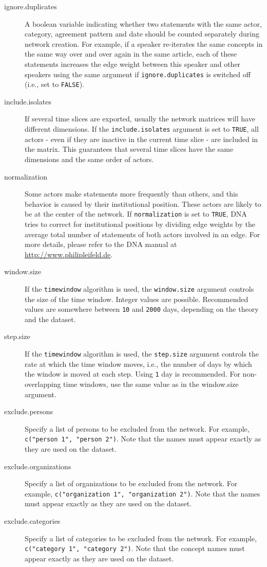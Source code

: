 \documentclass[a4paper, 10pt]{article}
\begin{document}
\begin{description}
  \item[ignore.duplicates]{ A boolean variable indicating whether two statements with the same actor, category, agreement pattern and date should be counted separately during network creation. For example, if a speaker re-iterates the same concepts in the same way over and over again in the same article, each of these statements increases the edge weight between this speaker and other speakers using the same argument if \texttt{ignore.duplicates} is switched off (i.e., set to \texttt{FALSE}). }
  \item[include.isolates]{ If several time slices are exported, usually the network matrices will have different dimensions. If the \texttt{include.isolates} argument is set to \texttt{TRUE}, all actors - even if they are inactive in the current time slice - are included in the matrix. This guarantees that several time slices have the same dimensions and the same order of actors.}
  \item[normalization]{ Some actors make statements more frequently than others, and this behavior is caused by their institutional position. These actors are likely to be at the center of the network. If \texttt{normalization} is set to \texttt{TRUE}, DNA tries to correct for institutional positions by dividing edge weights by the average total number of statements of both actors involved in an edge. For more details, please refer to the DNA manual at \url{http://www.philipleifeld.de}. }
  \item[window.size]{If the \texttt{timewindow} algorithm is used, the \texttt{window.size} argument controls the size of the time window. Integer values are possible. Recommended values are somewhere between \texttt{10} and \texttt{2000} days, depending on the theory and the dataset. }
  \item[step.size]{ If the \texttt{timewindow} algorithm is used, the \texttt{step.size} argument controls the rate at which the time window moves, i.e., the number of days by which the window is moved at each step. Using \texttt{1} day is recommended. For non-overlapping time windows, use the same value as in the window.size argument. }
  \item[exclude.persons]{ Specify a list of persons to be excluded from the network. For example, \texttt{c("person 1", "person 2")}. Note that the names must appear exactly as they are used on the dataset. }
  \item[exclude.organizations]{ Specify a list of organizations to be excluded from the network. For example, \texttt{c("organization 1", "organization 2")}. Note that the names must appear exactly as they are used on the dataset. }
  \item[exclude.categories]{ Specify a list of categories to be excluded from the network. For example, \texttt{c("category 1", "category 2")}. Note that the concept names must appear exactly as they are used on the dataset. }
\end{description}
\end{document}
